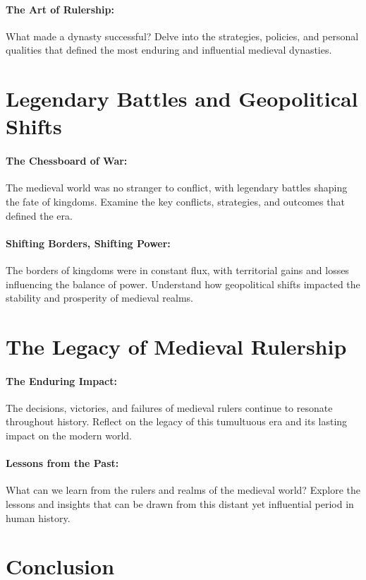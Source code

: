 \documentclass[a4paper,12pt]{book}
\begin{document}
\paragraph{The Art of Rulership:}
What made a dynasty successful? Delve into the strategies, policies, and personal qualities that defined the most enduring and influential medieval dynasties.

\section*{Legendary Battles and Geopolitical Shifts}

\paragraph{The Chessboard of War:}
The medieval world was no stranger to conflict, with legendary battles shaping the fate of kingdoms. Examine the key conflicts, strategies, and outcomes that defined the era.

\paragraph{Shifting Borders, Shifting Power:}
The borders of kingdoms were in constant flux, with territorial gains and losses influencing the balance of power. Understand how geopolitical shifts impacted the stability and prosperity of medieval realms.

\section*{The Legacy of Medieval Rulership}

\paragraph{The Enduring Impact:}
The decisions, victories, and failures of medieval rulers continue to resonate throughout history. Reflect on the legacy of this tumultuous era and its lasting impact on the modern world.

\paragraph{Lessons from the Past:}
What can we learn from the rulers and realms of the medieval world? Explore the lessons and insights that can be drawn from this distant yet influential period in human history.

\section*{Conclusion}
\end{document}
